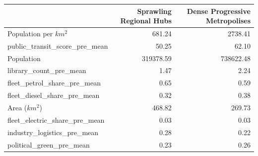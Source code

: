 \begin{tabular}{lrr}
\toprule
 & Sprawling Regional Hubs & Dense Progressive Metropolises \\
\midrule
Population per $km^2$ & 681.24 & 2738.41 \\
public_transit_score_pre_mean & 50.25 & 62.10 \\
Population & 319378.59 & 738622.48 \\
library_count_pre_mean & 1.47 & 2.24 \\
fleet_petrol_share_pre_mean & 0.65 & 0.59 \\
fleet_diesel_share_pre_mean & 0.32 & 0.38 \\
Area ($km^2$) & 468.82 & 269.73 \\
fleet_electric_share_pre_mean & 0.03 & 0.03 \\
industry_logistics_pre_mean & 0.28 & 0.22 \\
political_green_pre_mean & 0.23 & 0.26 \\
\bottomrule
\end{tabular}
